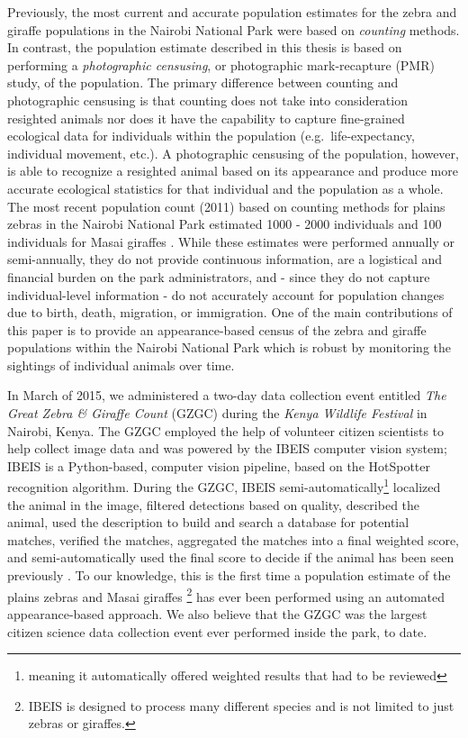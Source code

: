 Previously, the most current and accurate population estimates for the zebra and giraffe populations in the Nairobi National Park were based on \textit{counting} methods.  In contrast, the population estimate described in this thesis is based on performing a \textit{photographic censusing}, or photographic mark-recapture (PMR)\cite{bolger_computer-assisted_2012} study, of the population.  The primary difference between counting and photographic censusing is that counting does not take into consideration resighted animals nor does it have the capability to capture fine-grained ecological data for individuals within the population (e.g.\ life-expectancy, individual movement, etc.).  A photographic censusing of the population, however, is able to recognize a resighted animal based on its appearance and produce more accurate ecological statistics for that individual and the population as a whole.  The most recent population count (2011) based on counting methods for plains zebras in the Nairobi National Park estimated 1000 - 2000 individuals and 100 individuals for Masai giraffes \cite{ogutu_changing_2013}.  While these estimates were performed annually or semi-annually, they do not provide continuous information, are a logistical and financial burden on the park administrators, and - since they do not capture individual-level information - do not accurately account for population changes due to birth, death, migration, or immigration.  One of the main contributions of this paper is to provide an appearance-based census of the zebra and giraffe populations within the Nairobi National Park which is robust by monitoring the sightings of individual animals over time.

In March of 2015, we administered a two-day data collection event entitled \textit{The Great Zebra \& Giraffe Count} (GZGC) during the \textit{Kenya Wildlife Festival} in Nairobi, Kenya.  The GZGC employed the help of volunteer citizen scientists to help collect image data and was powered by the IBEIS computer vision system; IBEIS is a Python-based, computer vision pipeline, based on the HotSpotter \cite{crall_hotspotter_2013} recognition algorithm.  During the GZGC, IBEIS semi-automatically\footnote{meaning it automatically offered weighted results that had to be reviewed} localized the animal in the image, filtered detections based on quality, described the animal, used the description to build and search a database for potential matches, verified the matches, aggregated the matches into a final weighted score, and semi-automatically used the final score to decide if the animal has been seen previously \cite{gall_class-specific_2009, lowe_distinctive_2004, muja_fast_2009}.  To our knowledge, this is the first time a population estimate of the plains zebras and Masai giraffes \footnote{IBEIS is designed to process many different species and is not limited to just zebras or giraffes.} has ever been performed using an automated appearance-based approach.  We also believe that the GZGC was the largest citizen science data collection event ever performed inside the park, to date.

